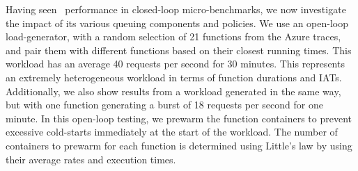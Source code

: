 Having seen \sysname~performance in closed-loop micro-benchmarks, we now investigate the impact of its various queuing components and policies.
We use an open-loop load-generator, with a random selection of 21 functions from the Azure traces, and pair them with different functions based on their closest running times.
This  workload has an average 40 requests per second for 30 minutes. 
This represents an extremely heterogeneous workload in terms of function durations and IATs.
Additionally, we also show results from a  workload generated in the same way, but with one function generating a burst of 18 requests per second for one minute.
In this open-loop testing, we prewarm the function containers to prevent excessive cold-starts immediately at the start of the workload.
The number of containers to prewarm for each function is determined using Little's law by using their average rates and execution times. 

